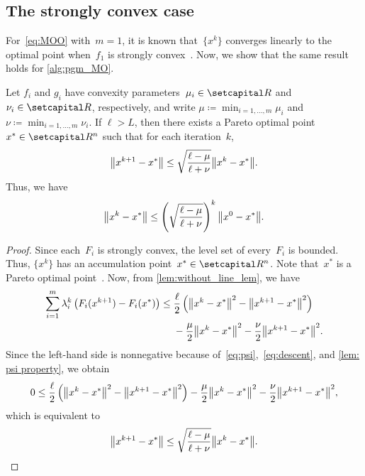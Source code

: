 \documentclass[../../main]{subfiles}
\begin{document}
\subsection{The strongly convex case}
For~\cref{eq:MOO} with~$m = 1$, it is known that~$\{x^k\}$ converges linearly to the optimal point when~$f_1$ is strongly convex~\cite{Beck2017}.
Now, we show that the same result holds for \cref{alg:pgm_MO}.
\begin{theorem} \label{thm:strongly convex}
    Let $f_i$ and $g_i$ have convexity parameters~$\mu_i \in \setR$ and $\nu_i \in \setR$, respectively, and write $\mu \coloneqq \min_{i = 1, \dots, m} \mu_i$ and $\nu \coloneqq \min_{i = 1, \dots, m} \nu_i$. If $\ell > L$, then there exists a Pareto optimal point~$x^\ast \in \setR^n$ such that for each iteration~$k$,
	\[
		\norm*{ x^{k + 1} - x^\ast } \le \sqrt{\frac{\ell - \mu}{\ell + \nu}} \norm*{x^k - x^\ast}.
	\]
	Thus, we have
	\[
		\norm*{ x^k - x^\ast } \le \left( \sqrt{\frac{\ell - \mu}{\ell + \nu}} \right)^k \norm*{x^0 - x^\ast}.
	\]
\end{theorem}
\begin{proof}
    Since each~$F_i$ is strongly convex, the level set of every~$F_i$ is bounded.
    Thus, $\{ x^k \}$ has an accumulation point~$x^\ast \in \setR^n$.
    Note that~$x^\ast$ is a Pareto optimal point~\cite[Lemma~2.2~and~Theorem~4.3]{Tanabe2019}.
    Now, from \cref{lem:without_line_lem}, we have
    \[
        \begin{split}
            \sum_{i = 1}^m \lambda_i^k \left(F_i(x^{k + 1}) - F_i(x^\ast)\right) \le{}& \frac{\ell}{2} \left( \norm*{ x^k - x^\ast }^2 - \norm*{ x^{k + 1} - x^\ast }^2 \right) \\
    &- \frac{\mu}{2} \norm*{ x^k - x^\ast }^2 - \frac{\nu}{2} \norm*{ x^{k + 1} - x^\ast }^2.
        \end{split}
    \]
    Since the left-hand side is nonnegative because of~\cref{eq:psi},~\cref{eq:descent}, and \cref{lem: psi property}, we obtain
	\[
		0 \le \frac{\ell}{2} \left( \norm*{x^k - x^\ast }^2 - \norm*{x^{k + 1} - x^\ast }^2 \right) - \frac{\mu}{2} \norm*{x^k - x^\ast }^2 - \frac{\nu}{2} \norm*{ x^{k + 1} - x^\ast }^2,
	\]
	which is equivalent to
	\[
		\norm*{ x^{k + 1} - x^\ast } \le \sqrt{\frac{\ell - \mu}{\ell + \nu}} \norm*{x^k - x^\ast}.
	\]
\end{proof}
\end{document}
